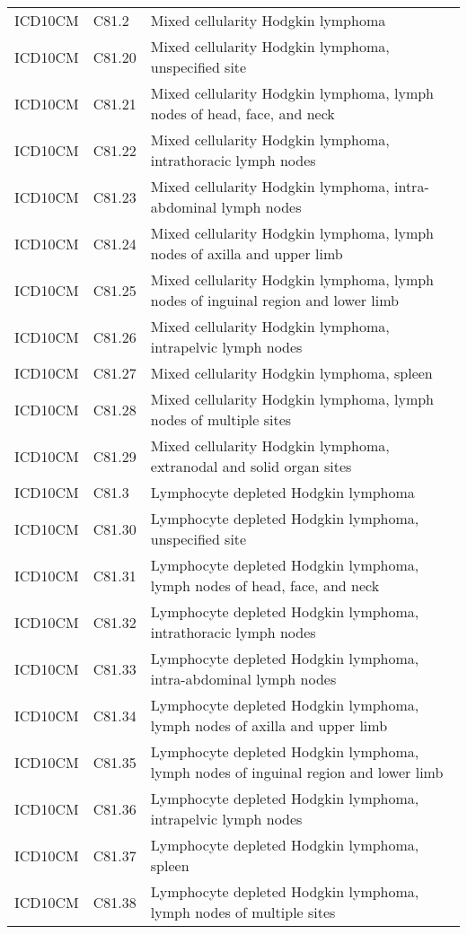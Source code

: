 \begin{longtable}{p{}p{}p{}}
  ICD10CM & C81.2 & Mixed cellularity Hodgkin lymphoma \\ 
  ICD10CM & C81.20 & Mixed cellularity Hodgkin lymphoma, unspecified site \\ 
  ICD10CM & C81.21 & Mixed cellularity Hodgkin lymphoma, lymph nodes of head, face, and neck \\ 
  ICD10CM & C81.22 & Mixed cellularity Hodgkin lymphoma, intrathoracic lymph nodes \\ 
  ICD10CM & C81.23 & Mixed cellularity Hodgkin lymphoma, intra-abdominal lymph nodes \\ 
  ICD10CM & C81.24 & Mixed cellularity Hodgkin lymphoma, lymph nodes of axilla and upper limb \\ 
  ICD10CM & C81.25 & Mixed cellularity Hodgkin lymphoma, lymph nodes of inguinal region and lower limb \\ 
  ICD10CM & C81.26 & Mixed cellularity Hodgkin lymphoma, intrapelvic lymph nodes \\ 
  ICD10CM & C81.27 & Mixed cellularity Hodgkin lymphoma, spleen \\ 
  ICD10CM & C81.28 & Mixed cellularity Hodgkin lymphoma, lymph nodes of multiple sites \\ 
  ICD10CM & C81.29 & Mixed cellularity Hodgkin lymphoma, extranodal and solid organ sites \\ 
  ICD10CM & C81.3 & Lymphocyte depleted Hodgkin lymphoma \\ 
  ICD10CM & C81.30 & Lymphocyte depleted Hodgkin lymphoma, unspecified site \\ 
  ICD10CM & C81.31 & Lymphocyte depleted Hodgkin lymphoma, lymph nodes of head, face, and neck \\ 
  ICD10CM & C81.32 & Lymphocyte depleted Hodgkin lymphoma, intrathoracic lymph nodes \\ 
  ICD10CM & C81.33 & Lymphocyte depleted Hodgkin lymphoma, intra-abdominal lymph nodes \\ 
  ICD10CM & C81.34 & Lymphocyte depleted Hodgkin lymphoma, lymph nodes of axilla and upper limb \\ 
  ICD10CM & C81.35 & Lymphocyte depleted Hodgkin lymphoma, lymph nodes of inguinal region and lower limb \\ 
  ICD10CM & C81.36 & Lymphocyte depleted Hodgkin lymphoma, intrapelvic lymph nodes \\ 
  ICD10CM & C81.37 & Lymphocyte depleted Hodgkin lymphoma, spleen \\ 
  ICD10CM & C81.38 & Lymphocyte depleted Hodgkin lymphoma, lymph nodes of multiple sites \\ 

\end{longtable}
